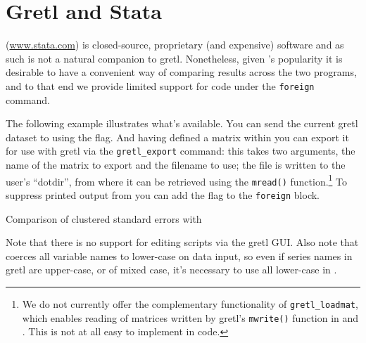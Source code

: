 \chapter{Gretl and Stata}
\label{chap:gretlStata}

 (\url{www.stata.com}) is closed-source, proprietary (and
expensive) software and as such is not a natural companion to
gretl. Nonetheless, given 's popularity it is
desirable to have a convenient way of comparing results across the two
programs, and to that end we provide limited support for 
code under the \texttt{foreign} command.

The following example illustrates what's available. You can send the
current gretl dataset to  using the 
flag. And having defined a matrix within  you can export it
for use with gretl via the \verb|gretl_export| command: this takes two
arguments, the name of the matrix to export and the filename to use;
the file is written to the user's ``dotdir'', from where it can be
retrieved using the \texttt{mread()} function.\footnote{We do not
  currently offer the complementary functionality of
  \verb|gretl_loadmat|, which enables reading of matrices written by
  gretl's \texttt{mwrite()} function in  and
  . This is not at all easy to implement in 
  code.} To suppress printed output from  you can add the
 flag to the \texttt{foreign} block.


\begin{script}[htbp]
  \caption{Comparison of clustered standard errors with }
\label{Stata-test}
\end{script}

Note that there is no support for editing  scripts via the
gretl GUI. Also note that  coerces all variable
names to lower-case on data input, so even if series names in
gretl are upper-case, or of mixed case, it's necessary to use
all lower-case in . 


